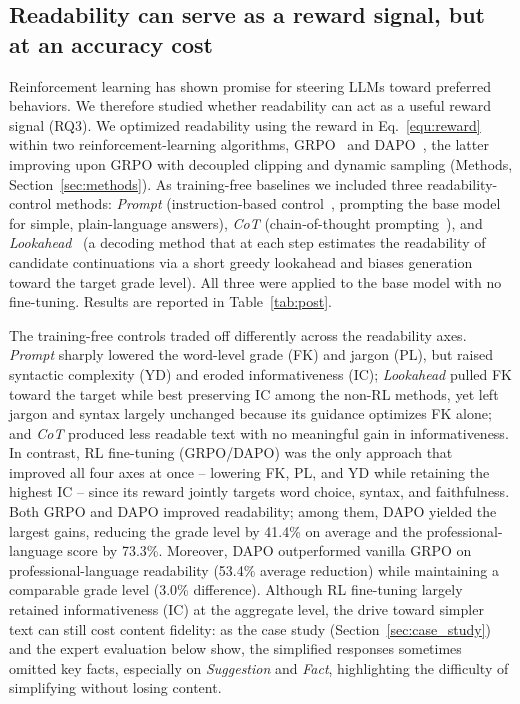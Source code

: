 \subsection{Readability can serve as a reward signal, but at an accuracy cost}

Reinforcement learning has shown promise for steering LLMs toward preferred behaviors. We therefore studied whether readability can act as a useful reward signal (RQ3).
We optimized readability using the reward in Eq.~\ref{equ:reward} within two reinforcement-learning algorithms, GRPO~\citep{shao2024deepseekmath} and DAPO~\citep{yu2025dapo}, the latter improving upon GRPO with decoupled clipping and dynamic sampling (Methods, Section~\ref{sec:methods}).
As training-free baselines we included three readability-control methods: \emph{Prompt} (instruction-based control~\citep{ribeiro-etal-2023-generating}, prompting the base model for simple, plain-language answers), \emph{CoT} (chain-of-thought prompting~\citep{wei2022chain}), and \emph{Lookahead}~\citep{ribeiro-etal-2023-generating} (a decoding method that at each step estimates the readability of candidate continuations via a short greedy lookahead and biases generation toward the target grade level). All three were applied to the base model with no fine-tuning.
Results are reported in Table~\ref{tab:post}.

The training-free controls traded off differently across the readability axes.
\emph{Prompt} sharply lowered the word-level grade (FK) and jargon (PL), but raised syntactic complexity (YD) and eroded informativeness (IC); \emph{Lookahead} pulled FK toward the target while best preserving IC among the non-RL methods, yet left jargon and syntax largely unchanged because its guidance optimizes FK alone; and \emph{CoT} produced less readable text with no meaningful gain in informativeness.
In contrast, RL fine-tuning (GRPO/DAPO) was the only approach that improved all four axes at once -- lowering FK, PL, and YD while retaining the highest IC -- since its reward jointly targets word choice, syntax, and faithfulness.
Both GRPO and DAPO improved readability; among them, DAPO yielded the largest gains, reducing the grade level by 41.4\% on average and the professional-language score by 73.3\%.
Moreover, DAPO outperformed vanilla GRPO on professional-language readability (53.4\% average reduction) while maintaining a comparable grade level (3.0\% difference).
Although RL fine-tuning largely retained informativeness (IC) at the aggregate level, the drive toward simpler text can still cost content fidelity: as the case study (Section~\ref{sec:case_study}) and the expert evaluation below show, the simplified responses sometimes omitted key facts, especially on \textit{Suggestion} and \textit{Fact}, highlighting the difficulty of simplifying without losing content.

